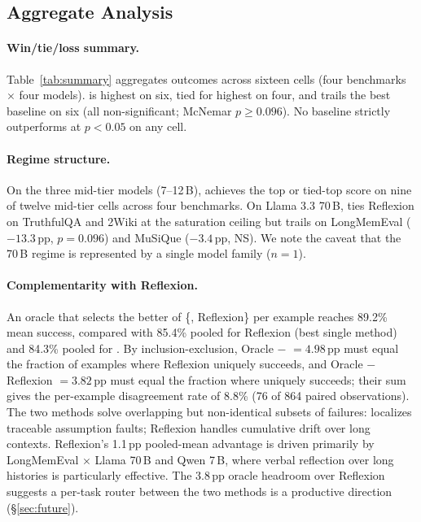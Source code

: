 \subsection{Aggregate Analysis}
\label{sec:aggregate}

\paragraph{Win/tie/loss summary.}
Table~\ref{tab:summary} aggregates outcomes across sixteen cells (four
benchmarks $\times$ four models).  \method is highest on six, tied for
highest on four, and trails the best baseline on six (all
non-significant; McNemar $p \geq 0.096$).  No baseline strictly
outperforms \method at $p < 0.05$ on any cell.

\paragraph{Regime structure.}
On the three mid-tier models (7--12\,B), \method achieves the top or
tied-top score on nine of twelve mid-tier cells across four benchmarks.
On Llama 3.3 70\,B, \method ties Reflexion on TruthfulQA and 2Wiki at
the saturation ceiling but trails on LongMemEval ($-13.3$\,pp,
$p{=}0.096$) and MuSiQue ($-3.4$\,pp, NS).  We note the caveat that
the 70\,B regime is represented by a single model family ($n{=}1$).

\paragraph{Complementarity with Reflexion.}
An oracle that selects the better of \{\method, Reflexion\} per
example reaches 89.2\% mean success, compared with 85.4\% pooled for
Reflexion (best single method) and 84.3\% pooled for \method.  By
inclusion-exclusion, Oracle $-$ \method $= 4.98$\,pp must equal the
fraction of examples where Reflexion uniquely succeeds, and Oracle
$-$ Reflexion $= 3.82$\,pp must equal the fraction where \method
uniquely succeeds; their sum gives the per-example disagreement rate
of 8.8\% (76 of 864 paired observations).  The two methods solve
overlapping but non-identical subsets of failures: \method localizes
traceable assumption faults; Reflexion handles cumulative drift over
long contexts.  Reflexion's 1.1\,pp pooled-mean advantage is driven
primarily by LongMemEval $\times$ Llama 70\,B and Qwen 7\,B, where
verbal reflection over long histories is particularly effective.
The 3.8\,pp oracle headroom over Reflexion suggests a per-task router
between the two methods is a productive direction
(\S\ref{sec:future}).

